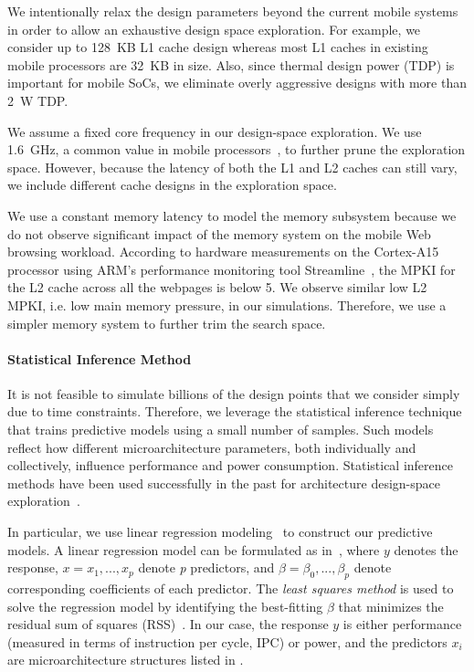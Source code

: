 

We intentionally relax the design parameters beyond the current mobile systems in order to allow an exhaustive design space exploration. For example, we consider up to 128~KB L1 cache design whereas most L1 caches in existing mobile processors are 32~KB in size. Also, since thermal design power (TDP) is important for mobile SoCs, we eliminate overly aggressive designs with more than 2~W TDP.

We assume a fixed core frequency in our design-space exploration. We use 1.6~GHz, a common value in mobile processors~\cite{snapdragon-wiki,exynos-wiki}, to further prune the exploration space. However, because the latency of both the L1 and L2 caches can still vary, we include different cache designs in the exploration space.

We use a constant memory latency to model the memory subsystem because we do not observe significant impact of the memory system on the mobile Web browsing workload. According to hardware measurements on the Cortex-A15 processor using ARM's performance monitoring tool Streamline~\cite{streamline}, the MPKI for the L2 cache across all the webpages is below 5. We observe similar low L2 MPKI, i.e. low main memory pressure, in our simulations. Therefore, we use a simpler memory system to further trim the search space.

\paragraph{Statistical Inference Method} It is not feasible to simulate billions of the design points that we consider simply due to time constraints. Therefore, we leverage the statistical inference technique that trains predictive models using a small number of samples. Such models reflect how different microarchitecture parameters, both individually and collectively, influence performance and power consumption. Statistical inference methods have been used successfully in the past for architecture design-space exploration~\cite{dse,comt}.

In particular, we use linear regression modeling~\cite{RMS} to construct our predictive models. A linear regression model can be formulated as in~, where $y$ denotes the response, $x = x_{1},...,x_{p}$ denote \textit{p} predictors, and $\beta = \beta_{0},...,\beta_{p}$ denote corresponding coefficients of each predictor. The \textit{least squares method} is used to solve the regression model by identifying the best-fitting $\beta$ that minimizes the residual sum of squares (RSS)~\cite{ESL}. In our case, the response $y$ is either performance (measured in terms of instruction per cycle, IPC) or power, and the predictors $x_{i}$ are microarchitecture structures listed in .

